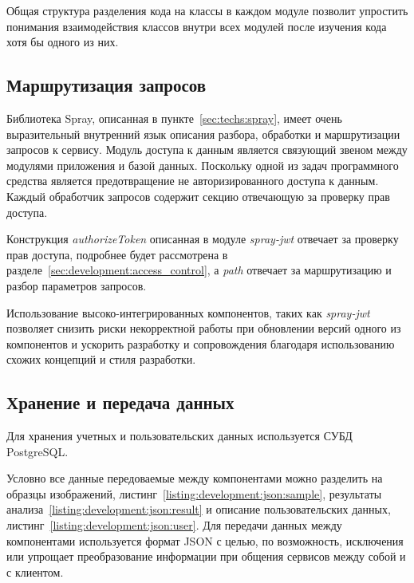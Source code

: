 Общая структура разделения кода на классы в каждом модуле позволит упростить понимания взаимодействия классов внутри всех модулей после изучения кода хотя бы одного из них.

\subsection{Маршрутизация запросов}
Библиотека Spray, описанная в пункте~\ref{sec:techs:spray}, имеет очень выразительный внутренний язык описания разбора, обработки и маршрутизации запросов к сервису. Модуль доступа к данным является связующий звеном между модулями приложения и базой данных. Поскольку одной из задач программного средства является предотвращение не авторизированного доступа к данным. Каждый обработчик запросов содержит секцию отвечающую за проверку прав доступа.

Конструкция \emph{authorizeToken} описанная в модуле \emph{spray-jwt} отвечает за проверку прав доступа, подробнее будет рассмотрена в разделе~\ref{sec:development:access_control}, а \emph{path} отвечает за маршрутизацию и разбор параметров запросов. 

Использование высоко-интегрированных компонентов, таких как \emph{spray-jwt} позволяет снизить риски некорректной работы при обновлении версий одного из компонентов и ускорить разработку и сопровождения благодаря использованию схожих концепций и стиля разработки.

\subsection{Хранение и передача данных}
Для хранения учетных и пользовательских данных используется СУБД PostgreSQL.

Условно все данные передоваемые между компонентами можно разделить на образцы изображений, листинг~\ref{listing:development:json:sample}, результаты анализа~\ref{listing:development:json:result} и описание пользовательских данных, листинг~\ref{listing:development:json:user}. Для передачи данных между компонентами используется формат JSON с целью, по возможность, исключения или упрощает преобразование информации при общения сервисов между собой и с клиентом. 



